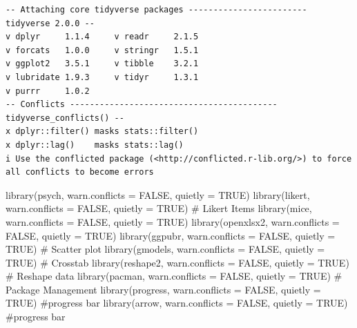 \documentclass[
  letterpaper,
  DIV=11,
  numbers=noendperiod]{scrartcl}
\newenvironment{Shaded}{\begin{snugshade}}{\end{snugshade}}
\newcommand{\AttributeTok}[1]{\textcolor[rgb]{0.40,0.45,0.13}{#1}}
\newcommand{\CommentTok}[1]{\textcolor[rgb]{0.37,0.37,0.37}{#1}}
\newcommand{\ConstantTok}[1]{\textcolor[rgb]{0.56,0.35,0.01}{#1}}
\newcommand{\FunctionTok}[1]{\textcolor[rgb]{0.28,0.35,0.67}{#1}}
\newcommand{\NormalTok}[1]{\textcolor[rgb]{0.00,0.23,0.31}{#1}}
\begin{document}
\begin{verbatim}
-- Attaching core tidyverse packages ------------------------ tidyverse 2.0.0 --
v dplyr     1.1.4     v readr     2.1.5
v forcats   1.0.0     v stringr   1.5.1
v ggplot2   3.5.1     v tibble    3.2.1
v lubridate 1.9.3     v tidyr     1.3.1
v purrr     1.0.2     
-- Conflicts ------------------------------------------ tidyverse_conflicts() --
x dplyr::filter() masks stats::filter()
x dplyr::lag()    masks stats::lag()
i Use the conflicted package (<http://conflicted.r-lib.org/>) to force all conflicts to become errors
\end{verbatim}

\begin{Shaded}
\begin{Highlighting}[]
\FunctionTok{library}\NormalTok{(psych, }\AttributeTok{warn.conflicts =} \ConstantTok{FALSE}\NormalTok{, }\AttributeTok{quietly =} \ConstantTok{TRUE}\NormalTok{)}
\FunctionTok{library}\NormalTok{(likert,  }\AttributeTok{warn.conflicts =} \ConstantTok{FALSE}\NormalTok{, }\AttributeTok{quietly =} \ConstantTok{TRUE}\NormalTok{) }\CommentTok{\# Likert Items}
\FunctionTok{library}\NormalTok{(mice,  }\AttributeTok{warn.conflicts =} \ConstantTok{FALSE}\NormalTok{, }\AttributeTok{quietly =} \ConstantTok{TRUE}\NormalTok{)}
\FunctionTok{library}\NormalTok{(openxlsx2, }\AttributeTok{warn.conflicts =} \ConstantTok{FALSE}\NormalTok{, }\AttributeTok{quietly =} \ConstantTok{TRUE}\NormalTok{)}
\FunctionTok{library}\NormalTok{(ggpubr, }\AttributeTok{warn.conflicts =} \ConstantTok{FALSE}\NormalTok{, }\AttributeTok{quietly =} \ConstantTok{TRUE}\NormalTok{) }\CommentTok{\# Scatter plot}
\FunctionTok{library}\NormalTok{(gmodels,  }\AttributeTok{warn.conflicts =} \ConstantTok{FALSE}\NormalTok{, }\AttributeTok{quietly =} \ConstantTok{TRUE}\NormalTok{) }\CommentTok{\# Crosstab}
\FunctionTok{library}\NormalTok{(reshape2, }\AttributeTok{warn.conflicts =} \ConstantTok{FALSE}\NormalTok{, }\AttributeTok{quietly =} \ConstantTok{TRUE}\NormalTok{) }\CommentTok{\# Reshape data}
\FunctionTok{library}\NormalTok{(pacman,  }\AttributeTok{warn.conflicts =} \ConstantTok{FALSE}\NormalTok{, }\AttributeTok{quietly =} \ConstantTok{TRUE}\NormalTok{) }\CommentTok{\# Package Management}
\FunctionTok{library}\NormalTok{(progress, }\AttributeTok{warn.conflicts =} \ConstantTok{FALSE}\NormalTok{, }\AttributeTok{quietly =} \ConstantTok{TRUE}\NormalTok{) }\CommentTok{\#progress bar}
\FunctionTok{library}\NormalTok{(arrow, }\AttributeTok{warn.conflicts =} \ConstantTok{FALSE}\NormalTok{, }\AttributeTok{quietly =} \ConstantTok{TRUE}\NormalTok{) }\CommentTok{\#progress bar}
\end{Highlighting}
\end{Shaded}
\end{document}
